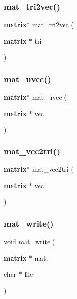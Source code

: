 \mbox{\label{mat_lib_8h_a49e418bbd96e928f695e6334ad6f58eb}} 
\subsubsection{mat\+\_\+tri2vec()}
{\footnotesize\ttfamily \textbf{ matrix}$\ast$ mat\+\_\+tri2vec (\begin{DoxyParamCaption}\item[{\textbf{ matrix} $\ast$}]{tri }\end{DoxyParamCaption})}

\mbox{\label{mat_lib_8h_a89bb47bada94133b60fb52e919c08162}} 
\subsubsection{mat\+\_\+uvec()}
{\footnotesize\ttfamily \textbf{ matrix}$\ast$ mat\+\_\+uvec (\begin{DoxyParamCaption}\item[{\textbf{ matrix} $\ast$}]{vec }\end{DoxyParamCaption})}

\mbox{\label{mat_lib_8h_aeff0e5ff7ff21e6eb5df0b825a16b569}} 
\subsubsection{mat\+\_\+vec2tri()}
{\footnotesize\ttfamily \textbf{ matrix}$\ast$ mat\+\_\+vec2tri (\begin{DoxyParamCaption}\item[{\textbf{ matrix} $\ast$}]{vec }\end{DoxyParamCaption})}

\mbox{\label{mat_lib_8h_a8f90c14951ff519072c79b4f828615f1}} 
\subsubsection{mat\+\_\+write()}
{\footnotesize\ttfamily void mat\+\_\+write (\begin{DoxyParamCaption}\item[{\textbf{ matrix} $\ast$}]{mat,  }\item[{char $\ast$}]{file }\end{DoxyParamCaption})}


